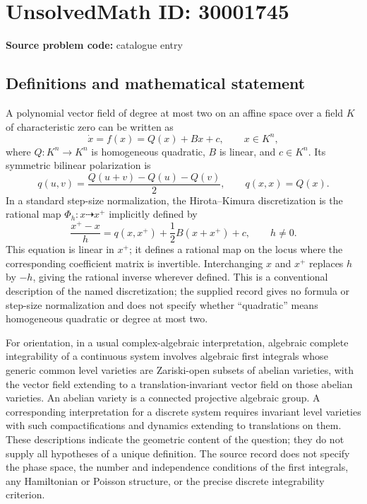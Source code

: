 \documentclass[11pt]{article}
\begin{document}
\section*{UnsolvedMath ID: 30001745}
\textbf{Source problem code:} catalogue entry
\subsection{Definitions and mathematical statement}
A polynomial vector field of degree at most two on an affine space over a field \(K\) of characteristic zero can be written as
\[
\dot x=f(x)=Q(x)+Bx+c,\qquad x\in K^n,
\]
where \(Q\colon K^n\to K^n\) is homogeneous quadratic, \(B\) is linear, and \(c\in K^n\). Its symmetric bilinear polarization is
\[
q(u,v)=\frac{Q(u+v)-Q(u)-Q(v)}{2},\qquad q(x,x)=Q(x).
\]
In a standard step-size normalization, the Hirota--Kimura discretization is the rational map \(\Phi_h\colon x\dashrightarrow x^+\) implicitly defined by
\[
\frac{x^+-x}{h}
=q(x,x^+)+\frac12 B(x+x^+)+c,
\qquad h\ne0.
\]
This equation is linear in \(x^+\); it defines a rational map on the locus where the corresponding coefficient matrix is invertible. Interchanging \(x\) and \(x^+\) replaces \(h\) by \(-h\), giving the rational inverse wherever defined. This is a conventional description of the named discretization; the supplied record gives no formula or step-size normalization and does not specify whether ``quadratic'' means homogeneous quadratic or degree at most two.

For orientation, in a usual complex-algebraic interpretation, algebraic complete integrability of a continuous system involves algebraic first integrals whose generic common level varieties are Zariski-open subsets of abelian varieties, with the vector field extending to a translation-invariant vector field on those abelian varieties. An abelian variety is a connected projective algebraic group. A corresponding interpretation for a discrete system requires invariant level varieties with such compactifications and dynamics extending to translations on them. These descriptions indicate the geometric content of the question; they do not supply all hypotheses of a unique definition. The source record does not specify the phase space, the number and independence conditions of the first integrals, any Hamiltonian or Poisson structure, or the precise discrete integrability criterion.
\end{document}
